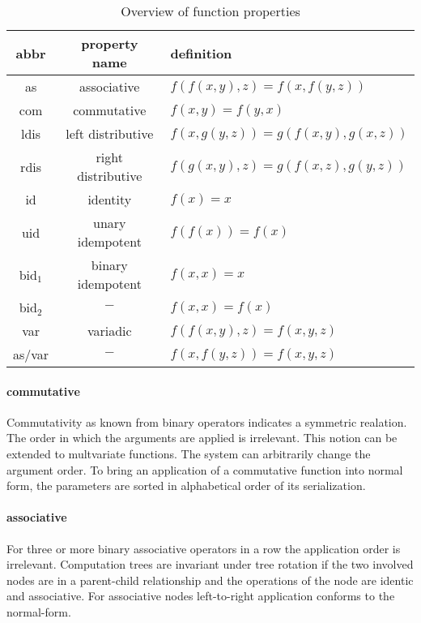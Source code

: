 \documentclass[english]{article}
\begin{document}
\begin{table}[h]
\def\arraystretch{1.2}%
\centering
\begin{tabular}{c | c | l}
abbr & property name & definition \\
\hline
as               & associative        & $f(f(x,y),z) = f(x,f(y,z))$ \\
com              & commutative        & $f(x,y)=f(y,x)$ \\
ldis             & left distributive  & $f(x,g(y,z))=g(f(x,y),g(x,z))$ \\
rdis             & right distributive & $f(g(x,y),z)=g(f(x,z),g(y,z))$ \\
id               & identity           & $f(x) = x$ \\
uid              & unary idempotent   & $f(f(x)) = f(x)$ \\
bid$_{\text{1}}$ & binary idempotent  & $f(x,x) = x$ \\
bid$_{\text{2}}$ & \multicolumn{1}{|c|}{$-$} & $f(x,x) = f(x)$ \\
var              & variadic           & $f(f(x,y),z) = f(x,y,z)$\\
as/var           & \multicolumn{1}{|c|}{$-$} & $f(x,f(y,z)) = f(x,y,z)$ \\
\end{tabular}
\caption{Overview of function properties}
\label{funcprops}
\end{table}

\paragraph{commutative} Commutativity as known from binary operators indicates a symmetric realation. The order in which the arguments are applied is irrelevant. This notion can be extended to multvariate functions. The system can arbitrarily change the argument order. To bring an application of a commutative function into normal form, the parameters are sorted in alphabetical order of its serialization.

\paragraph{associative} For three or more binary associative operators in a row the application order is irrelevant. Computation trees are invariant under tree rotation if the two involved nodes are in a parent-child relationship and the operations of the node are identic and associative. For associative nodes left-to-right application conforms to the normal-form.
\end{document}
